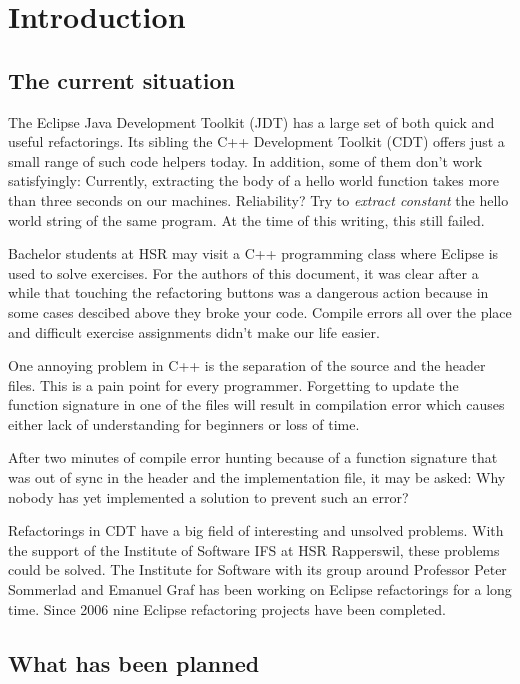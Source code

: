 \chapter{Introduction}
\thispagestyle{fancy}

\section{The current situation}

The Eclipse Java Development Toolkit (JDT) has a large set of both quick and
useful refactorings. Its sibling the C++ Development Toolkit (CDT) offers just a
small range of such code helpers today. In addition, some of them don't work
satisfyingly: Currently, extracting the body of a hello world function takes more
than three seconds on our machines. Reliability? Try to \textit{extract
constant} the hello world string of the same program. At the time of this 
writing, this still failed.

Bachelor students at HSR may visit a C++ programming class where
Eclipse is used to solve exercises. For the authors of this document, it was 
clear after a while that
touching the refactoring buttons was a dangerous action because in some cases
descibed above they broke your code. Compile errors all over the place and
difficult exercise assignments didn't make our life easier.

One annoying problem in C++ is the separation of the source and the header
files. This is a pain point for every programmer. Forgetting to update the
function signature in one of the files will result in compilation error which
causes either lack of understanding for beginners or loss of time.

After two minutes of compile error hunting because of a function signature that 
was out of sync in the header and the implementation file, it may be asked: Why 
nobody has yet implemented a solution to prevent such an error?

Refactorings in CDT have a big field of interesting and unsolved problems. With 
the support of the Institute of Software IFS at HSR Rapperswil, these problems 
could be solved. The Institute for Software with its group around Professor 
Peter Sommerlad and Emanuel Graf has been working on Eclipse refactorings for a 
long time. Since 2006 nine Eclipse refactoring projects have been completed.

\section{What has been planned}

